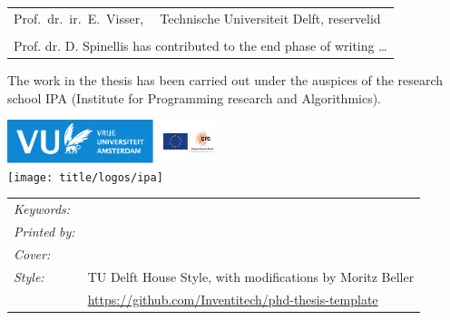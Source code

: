 \begin{titlepage}
\begin{tabular}{p{4.5cm}l}
    Prof.\ dr.\ ir.\ E.\ Visser, & Technische Universiteit Delft, reservelid \\ \\

    \multicolumn{2}{l}{Prof. dr. D. Spinellis has contributed to the end
    phase of writing \ldots} \\
\end{tabular}


\medskip
\medskip
\noindent The work in the thesis has been carried out under the auspices of the research school IPA
(Institute for Programming research and Algorithmics).

\medskip
\vfill
\begin{center}
    \includegraphics[height=0.5in]{title/logos/vulogo}
    \hspace{2em}
    \includegraphics[height=0.5in]{title/logos/erclogo}
    \\ \vspace{0.5cm}
    \texttt{[image: title/logos/ipa]}
\end{center}
\vfill

\noindent
\begin{tabular}{@{}p{}@{}p{}}
  \textit{Keywords:} &  \\[\medskipamount]
      \textit{Printed by:} &  \\[\medskipamount]
      \textit{Cover:} &  \\[\medskipamount]
      \textit{Style:} & TU Delft House Style, with modifications by Moritz Beller \\& \url{https://github.com/Inventitech/phd-thesis-template} \\[\medskipamount]
\end{tabular}


\end{titlepage}
